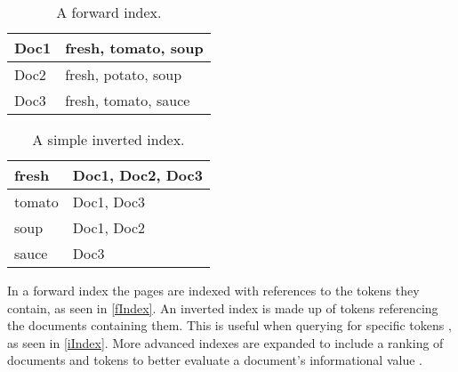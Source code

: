 \begin{minipage}{.40\textwidth}
  \centering
  \begin{table}[H]
	\centering
    \begin{tabular}{|l|l|}
\hline
Doc1 & fresh, tomato, soup \\ \hline
Doc2 & fresh, potato, soup \\ \hline
Doc3 & fresh, tomato, sauce \\ \hline
	\end{tabular}
	\caption{A forward index.}
	\label{fIndex}
  \end{table}
\end{minipage}
\begin{minipage}{0.5\textwidth}
  \centering
  \begin{table}[H]
	\centering
    \begin{tabular}{|l|l|}
\hline
fresh & Doc1, Doc2, Doc3 \\ \hline
tomato & Doc1, Doc3 \\ \hline
soup & Doc1, Doc2 \\ \hline
sauce & Doc3 \\ \hline
	\end{tabular}
	\caption{A simple inverted index.}
	\label{iIndex}
  \end{table}
\end{minipage}\nl

In a forward index the pages are indexed with references to the
tokens they contain, as seen in \autoref{fIndex}. An inverted index is made up
of tokens referencing the documents containing them. This is useful when
querying for specific tokens \citep{Index3}, as seen in \autoref{iIndex}. More
advanced indexes are expanded to include a ranking of documents and tokens to
better evaluate a document's informational value
\citep[p. 109]{manning2008introduction}.
